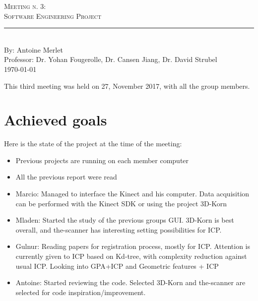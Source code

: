 \documentclass[aps,letterpaper,11pt]{revtex4}
\newcommand{\labno}{Meeting n. 3}
\newcommand{\labtitle}{Software Engineering Project}
\newcommand{\authorname}{Antoine Merlet}
\newcommand{\professor}{Dr. Yohan Fougerolle, Dr. Cansen Jiang, Dr. David Strubel}
\begin{document}
  
\begin{titlepage}
\begin{center}
{\LARGE \textsc{\labno:} \\ \vspace{4pt}}
{\Large \textsc{\labtitle} \\ \vspace{4pt}} 
\rule[13pt]{\textwidth}{1pt} \\ \vspace{150pt}
{\large By: \authorname \\ \vspace{10pt}
Professor: \professor \\ \vspace{10pt}
\today}
\end{center}




\end{titlepage}%
\newpage

This third meeting was held on 27, November 2017, with all the group members.

\section{Achieved goals}

Here is the state of the project at the time of the meeting:

\begin{itemize}
\item Previous projects are running on each member computer
\item All the previous report were read
\item Marcio: Managed to interface the Kinect and his computer. Data acquisition can be performed with the Kinect SDK or using the project 3D-Korn 
\item Mladen: Started the study of the previous groups GUI. 3D-Korn is best overall, and the-scanner has interesting setting possibilities for ICP.
\item Gulnur: Reading papers for registration process, mostly for ICP. Attention is currently given to ICP based on Kd-tree, with complexity reduction against usual ICP. Looking into GPA+ICP and Geometric features + ICP
\item Antoine: Started reviewing the code. Selected 3D-Korn and the-scanner are selected for code inspiration/improvement.
\end{itemize}
\end{document}
